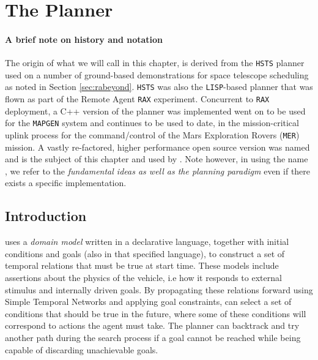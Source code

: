 \section{The \eu Planner }
\label{sec:basics}

\paragraph {A brief note on \eu history and notation} The origin of
what we will call \eu in this chapter, is derived from the
\texttt{HSTS} planner \cite{mus94} used on a number of ground-based
demonstrations for space telescope scheduling as noted in Section
\ref{sec:rabeyond}. \texttt{HSTS} was also the \texttt{LISP}-based
planner that was flown as part of the Remote Agent \texttt{RAX}
experiment. Concurrent to \texttt{RAX} deployment, a C++ version of
the planner was implemented  went on to
be used for the \texttt{MAPGEN} \cite{bresina05} system and continues
to be used to date, in the mission-critical uplink process for the
command/control of the Mars Exploration Rovers (\texttt{MER})
mission. A vastly re-factored, higher performance open source version
\cite{europapso} was named \eut and is the subject of this chapter and
used by \rxe.  Note however, in using the name \eue, we refer to the
\emph{fundamental ideas as well as the planning paradigm} even if
there exists a specific implementation.

\subsection{Introduction}
\label{sec:euintro}

\eu uses a \emph{domain model} 
written in a declarative language, together with initial conditions
and goals (also in that specified language), to construct a set of
temporal relations that must be true at start time. These models
include assertions about the physics of the vehicle, i.e how it
responds to external stimulus and internally driven goals. By
propagating these relations forward using Simple Temporal Networks
\cite{dechter91} and applying goal constraints, \eu can select a set
of conditions that should be true in the future, where some of these
conditions will correspond to actions the agent must take. The planner
can backtrack and try another path during the search process if a goal
cannot be reached while being capable of discarding unachievable
goals.

